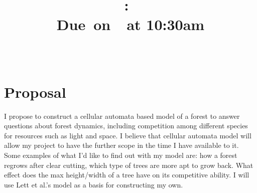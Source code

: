 \documentclass{article}
\title{
    \vspace{2in}
    \textmd{\textbf{\hmwkClass:\ \hmwkTitle}}\\
    \normalsize\vspace{0.1in}\small{Due\ on\ \hmwkDueDate\ at 10:30am}\\
    \vspace{0.1in}\large{\textit{\hmwkClassInstructor\ \hmwkClassTime}}
    \vspace{3in}
}
\author{\textbf{\hmwkAuthorName}}
\date{}
\begin{document}
\maketitle

\pagebreak
\vspace{.25cm}
\section*{Proposal}
I propose to construct a cellular automata based model of a forest to answer
questions about forest dynamics, including competition among different species for
resources such as light and space. I believe that cellular automata model will allow
 my project to have the further scope in the time I have available to it. Some examples
 of what I'd like to find out with my model are: how a forest regrows after clear cutting,
 which type of trees are more apt to grow back. What effect does the max height/width of a tree
have on its competitive ability. I will use Lett et al.'s  model as a basis for constructing
my own.
\end{document}
